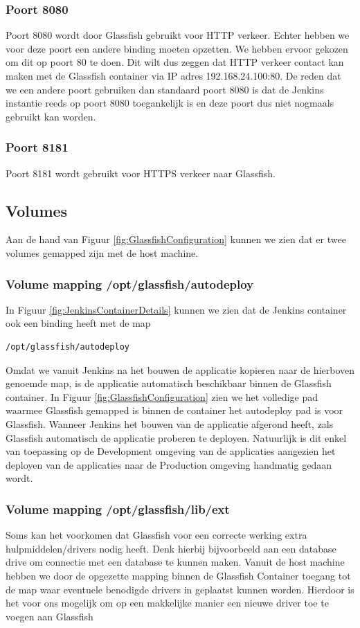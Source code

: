 \subsubsection{Poort 8080}
Poort 8080 wordt door Glassfish gebruikt voor HTTP verkeer. Echter hebben we voor deze poort een andere binding moeten opzetten. We hebben ervoor gekozen om dit op poort 80 te doen. Dit wilt dus zeggen dat HTTP verkeer contact kan maken met de Glassfish container via IP adres 192.168.24.100:80.
\newline
De reden dat we een andere poort gebruiken dan standaard poort 8080 is dat de Jenkins instantie reeds op poort 8080 toegankelijk is en deze poort dus niet nogmaals gebruikt kan worden.

\subsubsection{Poort 8181}
Poort 8181 wordt gebruikt voor HTTPS verkeer naar Glassfish. 

\subsection{Volumes}
Aan de hand van Figuur \ref{fig:GlassfishConfiguration} kunnen we zien dat er twee volumes gemapped zijn met de host machine.

\subsubsection{Volume mapping /opt/glassfish/autodeploy}
In Figuur \ref{fig:JenkinsContainerDetails} kunnen we zien dat de Jenkins container ook een binding heeft met de map \begin{lstlisting}
/opt/glassfish/autodeploy
\end{lstlisting}
Omdat we vanuit Jenkins na het bouwen de applicatie kopieren naar de hierboven genoemde map, is de applicatie automatisch beschikbaar binnen de Glassfish container.
\newline
In Figuur \ref{fig:GlassfishConfiguration} zien we het volledige pad waarmee Glassfish gemapped is binnen de container het autodeploy pad is voor Glassfish. Wanneer Jenkins het bouwen van de applicatie afgerond heeft, zals Glassfish automatisch de applicatie proberen te deployen. 
\newline
Natuurlijk is dit enkel van toepassing op de Development omgeving van de applicaties aangezien het deployen van de applicaties naar de Production omgeving handmatig gedaan wordt.
\subsubsection{Volume mapping /opt/glassfish/lib/ext}
Soms kan het voorkomen dat Glassfish voor een correcte werking extra hulpmiddelen/drivers nodig heeft. Denk hierbij bijvoorbeeld aan een database drive om connectie met een database te kunnen maken.
\newline
Vanuit de host machine hebben we door de opgezette mapping binnen de Glassfish Container toegang tot de map waar eventuele benodigde drivers in geplaatst kunnen worden. Hierdoor is het voor ons mogelijk om op een makkelijke manier een nieuwe driver toe te voegen aan Glassfish
\newpage
